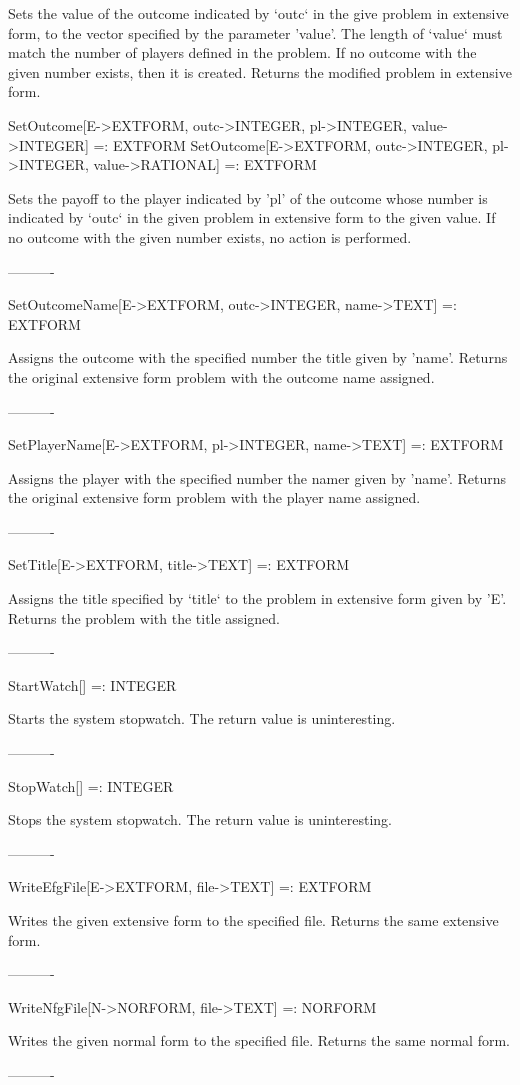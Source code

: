 	Sets the value of the outcome indicated by `outc` in the give problem 
in extensive form, to the vector specified by the parameter 'value'.  The 
length of `value` must match the number of players defined in the problem.  If
no outcome with the given number exists, then it is created.  Returns the 
modified problem in extensive form.


SetOutcome[E->EXTFORM, outc->INTEGER, pl->INTEGER, value->INTEGER] =: EXTFORM
SetOutcome[E->EXTFORM, outc->INTEGER, pl->INTEGER, value->RATIONAL] =: EXTFORM

	Sets the payoff to the player indicated by 'pl' of the outcome whose 
number is indicated by `outc` in the given problem in extensive form to the
given value.  If no outcome with the given number exists, no action is 
performed. 

----------

SetOutcomeName[E->EXTFORM, outc->INTEGER, name->TEXT] =: EXTFORM

	Assigns the outcome with the specified number the title given by 
'name'.  Returns the original extensive form problem with the outcome name 
assigned.

----------

SetPlayerName[E->EXTFORM, pl->INTEGER, name->TEXT] =: EXTFORM

	Assigns the player with the specified number the namer given by 'name'.
Returns the original extensive form problem with the player name assigned.

----------

SetTitle[E->EXTFORM, title->TEXT] =: EXTFORM

	Assigns the title specified by `title` to the problem in extensive form
given by 'E'.  Returns the problem with the title assigned.

----------

StartWatch[] =: INTEGER

	Starts the system stopwatch.  The return value is uninteresting.

----------

StopWatch[] =: INTEGER

	Stops the system stopwatch.  The return value is uninteresting.

----------

WriteEfgFile[E->EXTFORM, file->TEXT] =: EXTFORM

	Writes the given extensive form to the specified file.  Returns the
same extensive form.

----------

WriteNfgFile[N->NORFORM, file->TEXT] =: NORFORM

	Writes the given normal form to the specified file.  Returns the
same normal form.

----------





























